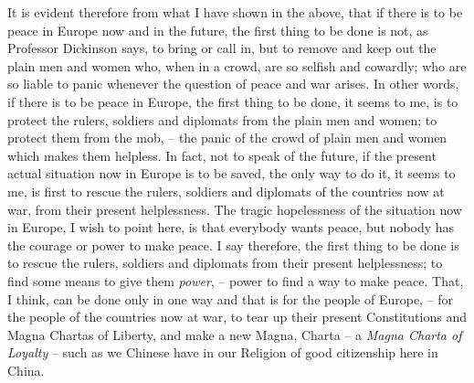 It is evident therefore from what I have shown in the above,
that if there is to be peace in Europe now and in the future,
the first thing to be done is not, as Professor Dickinson says, to bring or call in,
but to remove and keep out the plain men and women who,
when in a crowd, are so selfish and cowardly;
who are so liable to panic whenever the question of peace and war arises.
In other words, if there is to be peace in Europe, the first thing to be done,
it seems to me, is to protect the rulers, soldiers and diplomats from the plain men and women;
to protect them from the mob,
-- the panic of the crowd of plain men and women which makes them helpless.
In fact, not to speak of the future,
if the present actual situation now in Europe is to be saved, the only way to do it,
it seems to me, is first to rescue the rulers, soldiers and diplomats of the countries now at war, 
from their present helplessness.
The tragic hopelessness of the situation now in Europe,
I wish to point here, is that everybody wants peace, but nobody has the courage or power to make peace. I say therefore, the first thing to be done is to rescue the rulers, soldiers and diplomats from their present helplessness;
to find some means to give them \emph{power}, -- power to find a way to make peace.
That, I think, can be done only in one way and that is for the people of Europe,
-- for the people of the countries now at war,
to tear up their present Constitutions and Magna Chartas of Liberty,
and make a new Magna, Charta
-- a \emph{Magna Charta of Loyalty} --
such as we Chinese have in our Religion of good citizenship here in China.

